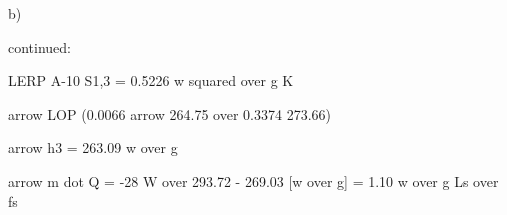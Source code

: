 b)

continued:

LERP A-10 S1,3 = 0.5226 w squared over g K

arrow LOP (0.0066 arrow 264.75 over 0.3374 273.66)

arrow h3 = 263.09 w over g

arrow m dot Q = -28 W over 293.72 - 269.03 [w over g] = 1.10 w over g Ls over fs